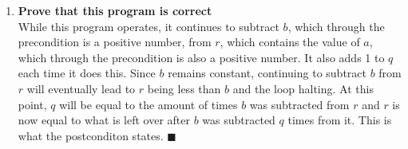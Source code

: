 \documentclass{article}
\begin{document}
\begin{enumerate}
\item \textbf{Prove that this program is correct} \\
While this program operates, it continues to subtract $b$, which through the precondition is a positive number, from $r$, which contains the value of $a$, which through the precondition is also a positive number. It also adds 1 to $q$ each time it does this. Since $b$ remains constant, continuing to subtract $b$ from $r$ will eventually lead to $r$ being less than $b$ and the loop halting. At this point, $q$ will be equal to the amount of times $b$ was subtracted from $r$ and $r$ is now equal to what is left over after $b$ was subtracted $q$ times from it. This is what the postconditon states. $\blacksquare$
\end{enumerate}
\end{document}
